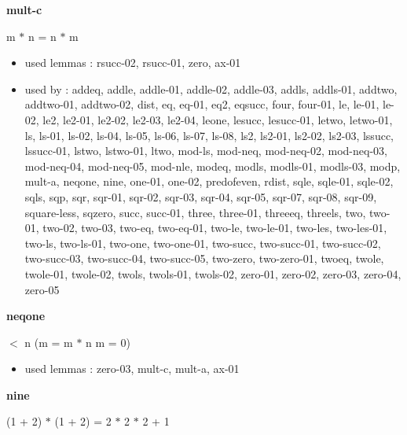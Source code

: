 \documentclass[a4paper]{article}
\begin{document}
\medskip

\bigskip

{\large\bf mult-c}

\medskip

 \Fol m $*$ n = n $*$ m

\begin{itemize}


\item       used lemmas  : rsucc-02, rsucc-01, zero, ax-01
\item       used by      : addeq, addle, addle-01, addle-02, addle-03, addls, addls-01, addtwo, addtwo-01, addtwo-02, dist, eq, eq-01, eq2, eqsucc, four, four-01, le, le-01, le-02, le2, le2-01, le2-02, le2-03, le2-04, leone, lesucc, lesucc-01, letwo, letwo-01, ls, ls-01, ls-02, ls-04, ls-05, ls-06, ls-07, ls-08, ls2, ls2-01, ls2-02, ls2-03, lssucc, lssucc-01, lstwo, lstwo-01, ltwo, mod-ls, mod-neq, mod-neq-02, mod-neq-03, mod-neq-04, mod-neq-05, mod-nle, modeq, modls, modls-01, modls-03, modp, mult-a, neqone, nine, one-01, one-02, predofeven, rdist, sqle, sqle-01, sqle-02, sqls, sqp, sqr, sqr-01, sqr-02, sqr-03, sqr-04, sqr-05, sqr-07, sqr-08, sqr-09, square-less, sqzero, succ, succ-01, three, three-01, threeeq, threels, two, two-01, two-02, two-03, two-eq, two-eq-01, two-le, two-le-01, two-les, two-les-01, two-ls, two-ls-01, two-one, two-one-01, two-succ, two-succ-01, two-succ-02, two-succ-03, two-succ-04, two-succ-05, two-zero, two-zero-01, twoeq, twole, twole-01, twole-02, twols, twols-01, twols-02, zero-01, zero-02, zero-03, zero-04, zero-05

\end{itemize}

\medskip

\bigskip

{\large\bf neqone}

\medskip

  $<$ n \Imp (m = m $*$ n \Equiv m = 0)

\begin{itemize}


\item       used lemmas  : zero-03, mult-c, mult-a, ax-01

\end{itemize}

\medskip

\bigskip

{\large\bf nine}

\medskip

 \Fol (1 + 2) $*$ (1 + 2) = 2 $*$ 2 $*$ 2 + 1
\end{document}
